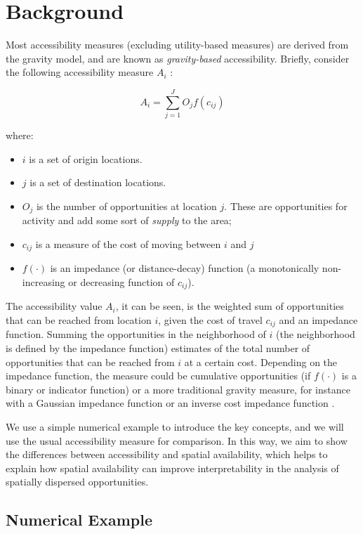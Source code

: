 \documentclass[]{elsarticle} %
\providecommand{\tightlist}{%
  \setlength{\itemsep}{0pt}\setlength{\parskip}{0pt}}
\begin{document}
\hypertarget{background}{%
\section{Background}\label{background}}

Most accessibility measures (excluding utility-based measures) are
derived from the gravity model, and are known as \emph{gravity-based}
accessibility. Briefly, consider the following accessibility measure
\(A_i\) :

\[
A_i = \sum_{j=1}^JO_jf(c_{ij})
\]

\noindent where:

\begin{itemize}
\tightlist
\item
  \(i\) is a set of origin locations.
\item
  \(j\) is a set of destination locations.
\item
  \(O_j\) is the number of opportunities at location \(j\). These are
  opportunities for activity and add some sort of \emph{supply} to the
  area;
\item
  \(c_{ij}\) is a measure of the cost of moving between \(i\) and \(j\)
\item
  \(f(\cdot)\) is an impedance (or distance-decay) function (a
  monotonically non-increasing or decreasing function of \(c_{ij}\)).
\end{itemize}

The accessibility value \(A_i\), it can be seen, is the weighted sum of
opportunities that can be reached from location \(i\), given the cost of
travel \(c_{ij}\) and an impedance function. Summing the opportunities
in the neighborhood of \(i\) (the neighborhood is defined by the
impedance function) estimates of the total number of opportunities that
can be reached from \(i\) at a certain cost. Depending on the impedance
function, the measure could be cumulative opportunities (if \(f(\cdot)\)
is a binary or indicator function) or a more traditional gravity
measure, for instance with a Gaussian impedance function or an inverse
cost impedance function .

We use a simple numerical example to introduce the key concepts, and we
will use the usual accessibility measure for comparison. In this way, we
aim to show the differences between accessibility and spatial
availability, which helps to explain how spatial availability can
improve interpretability in the analysis of spatially dispersed
opportunities.

\hypertarget{numerical-example}{%
\subsection{Numerical Example}\label{numerical-example}}
\end{document}
